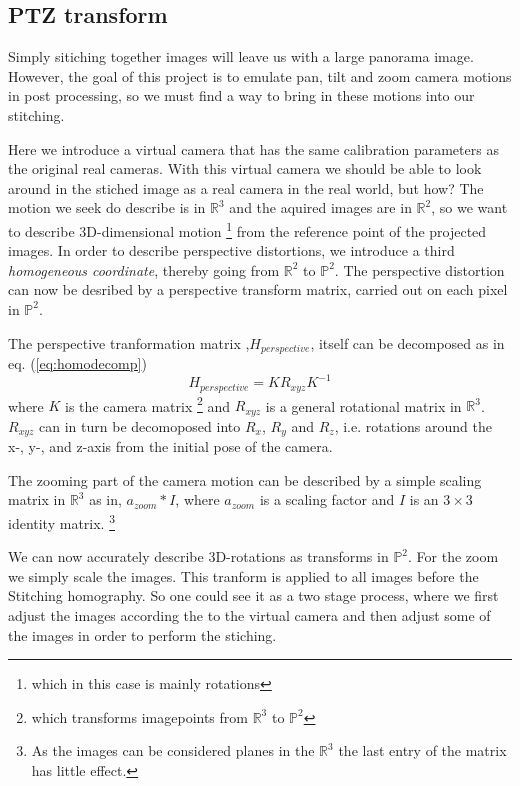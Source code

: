 \subsection{PTZ transform}
	Simply sitiching together images will leave us with a large panorama image. However, the goal of this project is to emulate pan, tilt and zoom camera motions in post processing, so we must find a way to bring in these motions into our stitching. 

	Here we introduce a virtual camera that has the same calibration parameters as the original real cameras. With this virtual camera we should be able to look around in the stiched image as a real camera in the real world, but how? The motion we seek do describe is in $\mathbb{R}^3$ and the aquired images are in $\mathbb{R}^2$, so we want to describe 3D-dimensional motion \footnote{which in this case is mainly rotations} from the reference point of the projected images. In order to describe perspective distortions, we introduce a third \emph{homogeneous coordinate}, thereby going from $\mathbb{R}^2$ to $\mathbb{P}^2$. The perspective distortion can now be desribed by a perspective transform matrix, carried out on each pixel in $\mathbb{P}^2$.

	The perspective tranformation matrix ,$H_{perspective}$, itself can be decomposed as in eq. (\ref{eq:homodecomp}) 
	\begin{equation}
		H_{perspective}=KR_{xyz}K^{-1}
		\label{eq:homodecomp}
	\end{equation}
	where $K$ is the camera matrix \footnote{which transforms imagepoints from $\mathbb{R}^3$ to $\mathbb{P}^2$} and $R_{xyz}$ is a general rotational matrix in $\mathbb{R}^3$. 
$R_{xyz}$ can in turn be decomoposed into $R_x$, $R_y$ and $R_z$, i.e. rotations around the x-, y-, and z-axis from the initial pose of the camera.

	The zooming part of the camera motion can be described by a simple scaling matrix in $\mathbb{R}^3$ as in, $a_{zoom}*I$, where $a_{zoom}$ is a scaling factor and $I$ is an $3 \times 3$ identity matrix. \footnote{As the images can be considered planes in the $\mathbb{R}^3$ the last entry of the matrix has little effect.}

	We can now accurately describe 3D-rotations as transforms in $\mathbb{P}^2$. For the zoom we simply scale the images. This tranform is applied to all images before the Stitching homography. So one could see it as a two stage process, where we first adjust the images according the to the virtual camera and then adjust some of the images in order to perform the stiching. 
